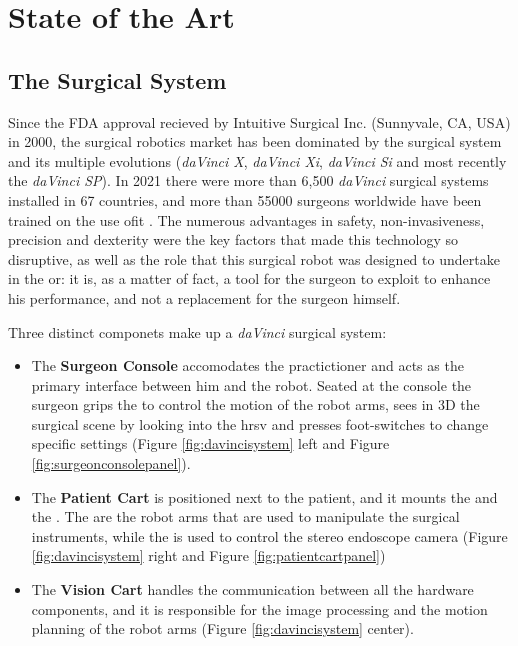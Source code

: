 \documentclass[../main.tex]{subfiles}
\begin{document}
\chapter{State of the Art}

\section{The \davinci Surgical System}
Since the FDA approval recieved by Intuitive Surgical Inc. (Sunnyvale, CA, USA) in 2000, the surgical robotics market has been dominated by the \davinci surgical system and its multiple evolutions (\textit{daVinci X}, \textit{daVinci Xi}, \textit{daVinci Si} and most recently the \textit{daVinci SP}). In 2021 there were more than 6,500 \textit{daVinci} surgical systems installed in 67 countries, and more than 55000 surgeons worldwide have been trained on the use ofit \cite{Intuitive2021}. The numerous advantages in safety, non-invasiveness, precision and dexterity were the key factors that made this technology so disruptive, as well as the role that this surgical robot was designed to undertake in the \ac{or}: it is, as a matter of fact, a tool for the surgeon to exploit to enhance his performance, and not a replacement for the surgeon himself.

Three distinct componets make up a \textit{daVinci} surgical system:
\begin{itemize}
   \item The \textbf{Surgeon Console} accomodates the practictioner and acts as the primary interface between him and the robot. Seated at the console the surgeon grips the \mtms to control the motion of the robot arms, sees in 3D the surgical scene by looking into the \ac{hrsv} and presses foot-switches to change specific settings (Figure \ref{fig:davincisystem} left and Figure \ref{fig:surgeonconsolepanel}).
    \item The \textbf{Patient Cart} is positioned next to the patient, and it mounts the \psms and the \ecm. The \psms are the robot arms that are used to manipulate the surgical instruments, while the \ecm is used to control the stereo endoscope camera (Figure \ref{fig:davincisystem} right and Figure \ref{fig:patientcartpanel})
    \item The \textbf{Vision Cart} handles the communication between all the hardware components, and it is responsible for the image processing and the motion planning of the robot arms (Figure \ref{fig:davincisystem} center).
\end{itemize}
\end{document}
